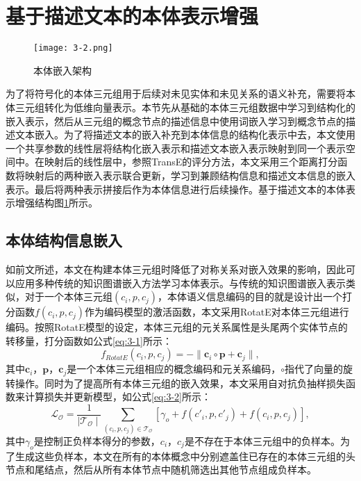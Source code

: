 \section{基于描述文本的本体表示增强}
\begin{figure}[!b]
  \centering
  \texttt{[image: 3-2.png]}
  \caption{本体嵌入架构}
  \label{fig:3-6}
\end{figure}

为了将符号化的本体三元组用于后续对未见实体和未见关系的语义补充，需要将本体三元组转化为低维向量表示。本节先从基础的本体三元组数据中学习到结构化的嵌入表示，然后从三元组的概念节点的描述信息中使用词嵌入学习到概念节点的描述文本嵌入。为了将描述文本的嵌入补充到本体信息的结构化表示中去，本文使用一个共享参数的线性层将结构化嵌入表示和描述文本嵌入表示映射到同一个表示空间中。在映射后的线性层中，参照TransE的评分方法，本文采用三个距离打分函数将映射后的两种嵌入表示联合更新，学习到兼顾结构信息和描述文本信息的嵌入表示。最后将两种表示拼接后作为本体信息进行后续操作。基于描述文本的本体表示增强结构图\ref{fig:3-6}所示。

\subsection{本体结构信息嵌入}
如前文所述，本文在构建本体三元组时降低了对称关系对嵌入效果的影响，因此可以应用多种传统的知识图谱嵌入方法学习本体表示。与传统的知识图谱嵌入表示类似，对于一个本体三元组\((c_{i},p,c_{j})\)，本体语义信息编码的目的就是设计出一个打分函数\(f(c_{i},p,c_{j})\)作为编码模型的激活函数，本文采用RotatE对本体三元组进行编码。按照RotatE模型的设定，本体三元组的元关系属性是头尾两个实体节点的转移量，打分函数如公式\ref{eq:3-1}所示：
\begin{equation}
  f_{RotatE}(c_{i},p,c_{j}) = - \| \textbf{c}_{i} \circ \textbf{p} + \textbf{c}_{j}\|, \label{eq:3-1}
\end{equation}
其中\(\textbf{c}_{i}\)，\(\textbf{p}\)，\(\textbf{c}_{j}\)是一个本体三元组相应的概念编码和元关系编码，\(\circ\)指代了向量的旋转操作。同时为了提高所有本体三元组的嵌入效果，本文采用自对抗负抽样损失函数来计算损失并更新模型，如公式\ref{eq:3-2}所示：
\begin{equation}
  \mathcal{L}_{\mathcal{O}} = \frac{1}{\mid \mathcal{T}_{\mathcal{O}}\mid} \sum_{(c_{i},p,c_{j}) \in \mathcal{T}_{\mathcal{O}}} [\gamma _{o} + f(c'_{i},p,c'_{j}) + f(c_{i},p,c_{j})], \label{eq:3-2}
\end{equation}
其中\(\gamma _{o}\)是控制正负样本得分的参数，\(c_{i}\)，\(c_{j}\)是不存在于本体三元组中的负样本。为了生成这些负样本，本文在所有的本体概念中分别遮盖住已存在的本体三元组的头节点和尾结点，然后从所有本体节点中随机筛选出其他节点组成负样本。

